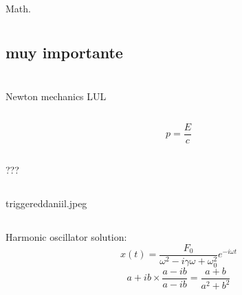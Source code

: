 \documentclass[12pt]{report}
\begin{document}
\subsection{}

Math.

\section{}

\subsection{}

\subsection{}

\subsection{muy importante}

\section{}

\subsection{}
Newton mechanics LUL

\subsection{}
\[p=\frac{E}{c}\]

\subsection{}
???

\subsection{}
triggereddaniil.jpeg

\subsection{}
Harmonic oscillator solution:
\[x(t)=\frac{F_0}{\omega^2-i\gamma\omega+\omega_0^2}e^{-i\omega t}\]
\[a+ib\times\frac{a-ib}{a-ib}=\frac{a+b}{a^2+b^2}\]
\end{document}
